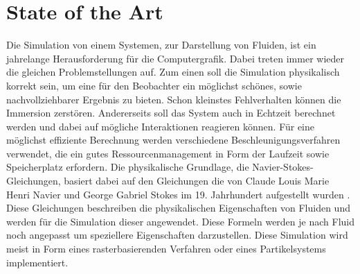 \documentclass[intern,palatino]{cgBA}
\begin{document}
\section{State of the Art}\label{state}
Die Simulation von einem Systemen, zur Darstellung von Fluiden, ist ein jahrelange Herausforderung für die Computergrafik. Dabei treten immer wieder die gleichen Problemstellungen auf. Zum einen soll die Simulation physikalisch korrekt sein, um eine für den Beobachter ein möglichst schönes, sowie nachvollziehbarer Ergebnis zu bieten. Schon kleinstes Fehlverhalten können die Immersion zerstören. Andererseits soll das System auch in Echtzeit berechnet werden und dabei auf mögliche Interaktionen reagieren können. Für eine möglichst effiziente Berechnung werden verschiedene Beschleunigungsverfahren verwendet, die ein gutes Ressourcenmanagement in Form der Laufzeit sowie Speicherplatz erfordern.
\newline \newline
Die physikalische Grundlage, die Navier-Stokes-Gleichungen, basiert dabei auf den Gleichungen die von Claude Louis Marie Henri Navier und George Gabriel Stokes im 19. Jahrhundert aufgestellt wurden \cite{wiki:xxx}. Diese Gleichungen beschreiben die physikalischen Eigenschaften von Fluiden und werden für die Simulation dieser angewendet. Diese Formeln werden je nach Fluid noch angepasst um speziellere Eigenschaften darzustellen.
\newline
Diese Simulation wird meist in Form eines rasterbasierenden Verfahren oder eines Partikelsystems implementiert.\newline

\end{document}
